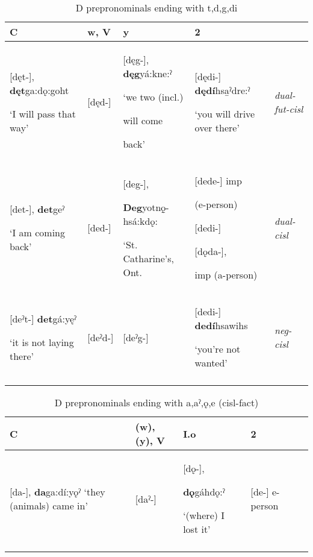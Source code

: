 
\begin{table}
\caption{D prepronominals ending with t,d,g,di}
\label{tab:1:dualnegfutcisl}
\scriptsize{
\begin{tabularx}{\textwidth}{XXXXX}
\lsptoprule
C & w, V & y & 2 & \\
\midrule
{}[dęt-], \textbf{dęt}ga:dǫ:goht 

‘I will pass that way’ & [dęd-] & [dęg-], \textbf{dęg}yá:kne:ˀ 

‘we two (incl.) 

will come 

back’ & [dędi-] \textbf{dędí}hsa̱ˀdre:ˀ

‘you will drive over there’ & {\itshape dual-fut-cisl}\\

{}[det-], \textbf{det}geˀ 

‘I am coming back’ & [ded-] & [deg-], 

\textbf{Deg}yotnǫ̱-hsá:kdǫ:

‘St. Catharine’s, Ont. & [dede-] imp 

(e-person) 

[dedi-] 

[dǫda-], 

imp (a-person) & {\itshape dual-cisl}\\

{}[deˀt-] \textbf{det}gá:yęˀ 

‘it is not laying there’ & [deˀd-] & [deˀg-] & [dedi-] \textbf{dedí}hsawihs 

‘you’re not wanted’ & {\itshape neg-cisl}\\
\lspbottomrule
\end{tabularx}}
\end{table}



\begin{table}
\caption{D prepronominals ending with a,aˀ,ǫ,e (cisl-fact)}
\label{tab:1:cislfac}
\scriptsize{
\begin{tabularx}{\textwidth}{XXXXX}
\lsptoprule
C & (w), (y), V & I.o & 2 \\
\midrule
{}[da-], \textbf{da}ga:dí:yǫˀ ‘they (animals) came in’ & [daˀ-] & [dǫ-], 

\textbf{dǫ}gáhdǫ:ˀ 

‘(where) I lost it’ & [de-] e-person\\
\lspbottomrule
\end{tabularx}}
\end{table}


